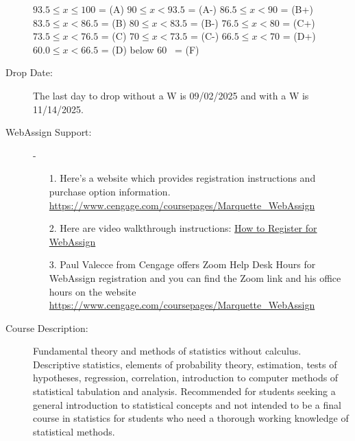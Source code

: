\documentclass[10pt]{article}
\begin{document}
\begin{description}
\hspace*{7.5mm} $93.5\leq x\leq 100$\hspace*{2.9mm}  = (A) \hspace*{10mm} $90\leq x<93.5$ = (A-) \hspace*{10mm} $86.5\leq x<90$ = (B+)\\
\hspace*{7.5mm} $83.5\leq x<86.5$\hspace*{2mm} = (B) \hspace*{10mm} $80\leq x<83.5$ = (B-) \hspace*{10mm} $76.5\leq x<80$ = (C+)\\
\hspace*{7.5mm} $73.5\leq x<76.5$\hspace*{2mm} = (C) \hspace*{10mm} $70\leq x<73.5$ = (C-) \hspace*{10mm} $66.5\leq x<70$ = (D+)\\
\hspace*{7.5mm} $60.0\leq x<66.5$\hspace*{2mm} = (D) \hspace*{10mm} below $60$ \hspace*{5mm}  \ = (F)\vspace{-.05in}

\item[Drop Date:] The last day to drop without a W is 09/02/2025 and with a W is 11/14/2025.

\item[WebAssign Support:] - 
\begin{enumerate}
\item[1.] Here’s a website which provides registration instructions and purchase option information. \url{https://www.cengage.com/coursepages/Marquette_WebAssign}
\item[2.] Here are video walkthrough instructions: \href{https://startstrong.cengage.com/webassign-not-integrated-ia-no/}{How to Register for WebAssign}
\item[3.] Paul Valecce from Cengage offers Zoom Help Desk Hours for WebAssign registration and you can find the Zoom link and his office hours on the website \url{https://www.cengage.com/coursepages/Marquette_WebAssign}
\end{enumerate}

\item[Course Description:] Fundamental theory and methods of statistics without calculus. Descriptive statistics, elements of probability theory, estimation, tests of hypotheses, regression, correlation, introduction to computer methods of statistical tabulation and analysis. Recommended for students seeking a general introduction to statistical concepts and not intended to be a final course in statistics for students who need a thorough working knowledge of statistical methods. 


\end{description}
\end{document}

